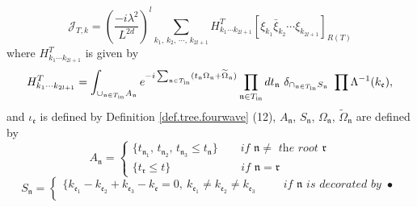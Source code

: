 \begin{lem}
\begin{equation}\label{eq.coefterm.fourwave}
\mathcal{J}_{T,k}=\left(\frac{-i\lambda^2}{L^{2d}}\right)^l\sum_{k_1,\, k_2,\, \cdots,\, k_{2l+1}} H^T_{k_1\cdots k_{2l+1}} [\xi_{k_1}\bar{\xi}_{k_2}\cdots\xi_{k_{2l+1}}]_{R(T)} 
\end{equation}
where $H^T_{k_1\cdots k_{2l+1}}$ is given by
\begin{equation}\label{eq.coef.fourwave}
H^T_{k_1\cdots k_{2l+1}}=\int_{\cup_{\mathfrak{n}\in T_{\text{in}}} A_{\mathfrak{n}}} e^{-i\sum_{\mathfrak{n}\in T_{\text{in}}} %
(t_{\mathfrak{n}}\Omega_{\mathfrak{n}}+\widetilde{\Omega}_{\mathfrak{n}})} \prod_{\mathfrak{n}\in T_{\text{in}}} dt_{\mathfrak{n}} %
\ \delta_{\cap_{\mathfrak{n}\in T_{\text{in}}} S_{\mathfrak{n}}}\ \prod_{%
}\Lambda^{-1}(k_{\mathfrak{e}}) ,
\end{equation}
and $ \iota_{\mathfrak{e}}$ is defined by Definition \ref{def.tree.fourwave} (12), $A_{\mathfrak{n}}$, $S_{\mathfrak{n}}$, $\Omega_{\mathfrak{n}}$, $\widetilde{\Omega}_{\mathfrak{n}}$ are defined by 
\begin{equation}
 A_{\mathfrak{n}}=
 \begin{cases}
 \{t_{\mathfrak{n}_1},\, t_{\mathfrak{n}_2},\, t_{\mathfrak{n}_3}\le t_{\mathfrak{n}}\} \qquad \textit{if }\mathfrak{n}\ne\textit{ the root }\mathfrak{r}
 \\
 \{t_{\mathfrak{r}}\le t\} \qquad\qquad\qquad\  \textit{if }\mathfrak{n}= \mathfrak{r}
 \end{cases}
\end{equation}
\begin{equation}
 S_{\mathfrak{n}}=
 \begin{cases}
 \{k_{\mathfrak{e}_1}-k_{\mathfrak{e}_2}+k_{\mathfrak{e}_3}-k_{\mathfrak{e}}=0,\ k_{\mathfrak{e}_1}\ne k_{\mathfrak{e}_2}\ne k_{\mathfrak{e}_3} \qquad \ \  \textit{if }\mathfrak{n}\textit{ is decorated by }\bullet
 \\

\end{cases}
\end{equation}
\end{lem}
